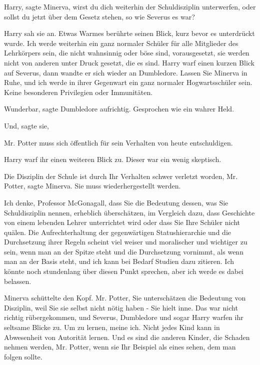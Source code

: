 \glqq{}Harry\grqq{}, sagte Minerva, \glqq{}wirst du dich weiterhin der
Schuldisziplin unterwerfen, oder sollst du jetzt über dem Gesetz stehen, so wie
Severus es war?\grqq{}

Harry sah sie an. Etwas Warmes berührte seinen Blick, kurz bevor es unterdrückt
wurde. \glqq{}Ich werde weiterhin ein ganz normaler Schüler für alle Mitglieder
des Lehrkörpers sein, die nicht wahnsinnig oder böse sind, vorausgesetzt, sie
werden nicht von anderen unter Druck gesetzt, die es sind.\grqq{} Harry warf
einen kurzen Blick auf Severus, dann wandte er sich wieder an Dumbledore. \glqq{}
Lassen Sie Minerva in Ruhe, und ich werde in ihrer Gegenwart ein ganz normaler
Hogwartsschüler sein. Keine besonderen Privilegien oder Immunitäten.\grqq{}

\glqq{}Wunderbar\grqq{}, sagte Dumbledore aufrichtig. \glqq{}Gesprochen wie ein
wahrer Held.\grqq{}

\glqq{}Und\grqq{}, sagte sie,

\glqq{}Mr. Potter muss sich öffentlich für sein Verhalten von heute
entschuldigen.\grqq{}

Harry warf ihr einen weiteren Blick zu. Dieser war ein wenig skeptisch.

\glqq{}Die Disziplin der Schule ist durch Ihr Verhalten schwer verletzt worden,
Mr. Potter\grqq{}, sagte Minerva. \glqq{}Sie muss wiederhergestellt
werden.\grqq{}

\glqq{}Ich denke, Professor McGonagall, dass Sie die Bedeutung dessen, was Sie
Schuldisziplin nennen, erheblich überschätzen, im Vergleich dazu, dass
Geschichte von einem lebenden Lehrer unterrichtet wird oder dass Sie Ihre
Schüler nicht quälen. Die Aufrechterhaltung der gegenwärtigen Statushierarchie
und die Durchsetzung ihrer Regeln scheint viel weiser und moralischer und
wichtiger zu sein, wenn man an der Spitze steht und die Durchsetzung vornimmt,
als wenn man an der Basis steht, und ich kann bei Bedarf Studien dazu zitieren.
Ich könnte noch stundenlang über diesen Punkt sprechen, aber ich werde es dabei
belassen.\grqq{}

Minerva schüttelte den Kopf. \glqq{}Mr. Potter, Sie unterschätzen die Bedeutung
von Disziplin, weil Sie sie selbst nicht nötig haben -\grqq{} Sie hielt inne.
Das war nicht richtig rübergekommen, und Severus, Dumbledore und sogar Harry
warfen ihr seltsame Blicke zu. \glqq{}Um zu lernen, meine ich. Nicht jedes Kind
kann in Abwesenheit von Autorität lernen. Und es sind die anderen Kinder, die
Schaden nehmen werden, Mr. Potter, wenn sie Ihr Beispiel als eines sehen, dem
man folgen sollte.\grqq{}

